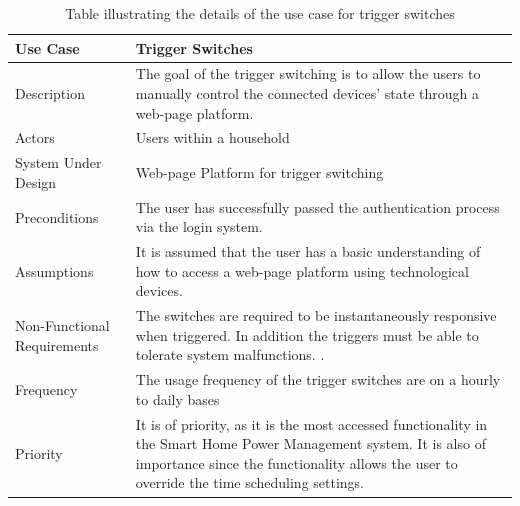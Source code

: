 \documentclass[10pt,twocolumn]{witseiepaper}
\begin{document}
	\begin{table}[H]
		\centering
		\caption{Table illustrating the details of the use case for trigger switches}
		\label{trigger_switching_use_case}
		\begin{tabular}{| p{22mm} | p{50mm} |}
			\hline
			\textbf{Use Case} & \textbf{Trigger Switches}\\
			\hline
			Description & The goal of the trigger switching is to allow the users to manually control the connected devices' state through a web-page platform.\\
			\hline
			Actors & Users within a household \\
			\hline
			System Under Design & Web-page Platform for trigger switching\\
			\hline
			Preconditions & The user has successfully passed the authentication process via the login system.\\
			\hline
			Assumptions & It is assumed that the user has a basic understanding of how to access a web-page platform using technological devices.\\
			\hline
			Non-Functional Requirements & The switches are required to be instantaneously responsive when triggered. In addition the triggers must be able to tolerate system malfunctions. .\\
			\hline
			Frequency & The usage frequency of the trigger switches are on a hourly to daily bases \\
			\hline
			Priority & It is of priority, as it is the most accessed functionality in the Smart Home Power Management system. It is also of importance since the functionality allows the user to override the time scheduling settings.\\
			\hline
		\end{tabular}
	\end{table}
	\newpage
\end{document}
